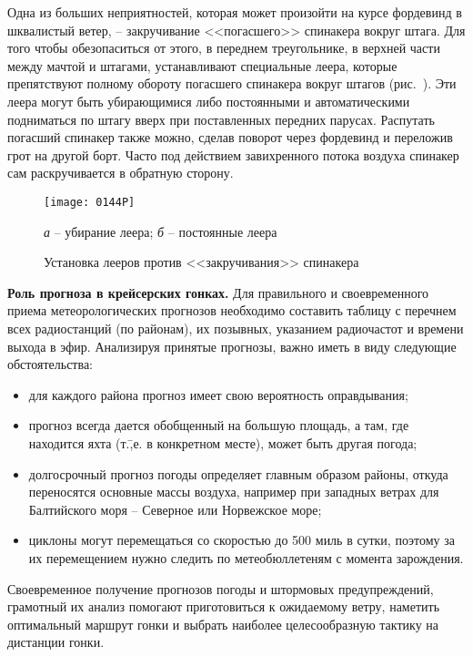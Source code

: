 Одна из больших неприятностей, которая может произойти на курсе фордевинд в шквалистый ветер, \--- закручивание <<погасшего>> спинакера вокруг штага. Для того чтобы обезопаситься от этого, в переднем треугольнике, в верхней части между мачтой и штагами, устанавливают специальные леера, которые препятствуют полному обороту погасшего спинакера вокруг штагов (рис.~). Эти леера могут быть убирающимися либо постоянными и автоматическими подниматься по штагу вверх при поставленных передних парусах. Распутать погасший спинакер также можно, сделав поворот через фордевинд и переложив грот на другой борт. Часто под действием завихренного потока воздуха спинакер сам раскручивается в обратную сторону.

\begin{figure*}[htb]
  \centering{}
  \texttt{[image: 0144P]}
  \caption{Установка лееров против <<закручивания>> спинакера}
  \label{fig:144}
  \small
  \centering{}
  \textit{а} \--- убирание леера; \textit{б} \--- постоянные леера
\end{figure*}

\textbf{Роль прогноза в крейсерских гонках.} Для правильного и своевременного приема метеорологических прогнозов необходимо составить таблицу с перечнем всех радиостанций (по районам), их позывных, указанием радиочастот и времени выхода в эфир. Анализируя принятые прогнозы, важно иметь в виду следующие обстоятельства: 
\begin{itemize}
\item для каждого района прогноз имеет свою вероятность оправдывания; 
\item прогноз всегда дается обобщенный на большую площадь, а там, где находится яхта (т.\=,е. в конкретном месте), может быть другая погода; 
\item долгосрочный прогноз погоды определяет главным образом районы, откуда переносятся основные массы воздуха, например при западных ветрах для Балтийского моря \--- Северное или Норвежское море; 
\item циклоны могут перемещаться со скоростью до 500 миль в сутки, поэтому за их перемещением нужно следить по метеобюллетеням с момента зарождения. 
\end{itemize}

Своевременное получение прогнозов погоды и штормовых предупреждений, грамотный их анализ помогают приготовиться к ожидаемому ветру, наметить оптимальный маршрут гонки и выбрать наиболее целесообразную тактику на дистанции гонки.
